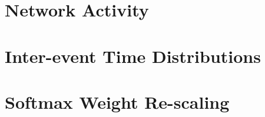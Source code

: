 

\section{Network Activity}
\label{sec:network-activity}




\section{Inter-event Time Distributions}
\label{sec:inter-event-time-dists}




\section{Softmax Weight Re-scaling}
\label{sec:softmax-rescaling}
